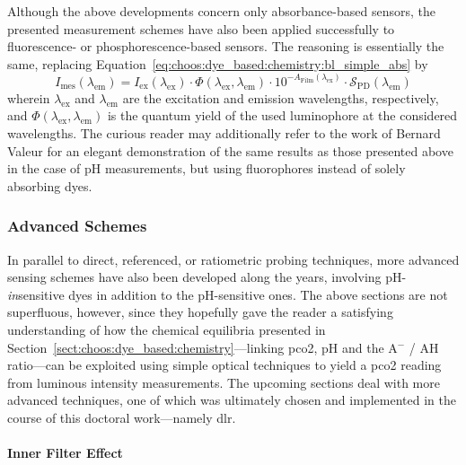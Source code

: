 Although the above developments concern only absorbance-based sensors, the presented measurement schemes have also been applied successfully to fluorescence- or phosphorescence-based sensors\cite{uttamlal1995, ge2003, ge2014, wang2020}. The reasoning is essentially the same, replacing Equation~\ref{eq:choos:dye_based:chemistry:bl_simple_abs} by
\begin{equation}
	I_\text{mes}(\lambda_\text{em}) = I_\text{ex}(\lambda_\text{ex}) \cdot \Phi(\lambda_\text{ex}, \lambda_\text{em}) \cdot 10^{-A_\text{Film}(\lambda_\text{ex})} \cdot \mathcal{S}_\text{PD}(\lambda_\text{em})
\end{equation}
wherein $\lambda_\text{ex}$ and $\lambda_\text{em}$ are the excitation and emission wavelengths, respectively, and $\Phi(\lambda_\text{ex}, \lambda_\text{em})$ is the quantum yield of the used luminophore at the considered wavelengths. The curious reader may additionally refer to the work of Bernard Valeur\cite[p.~338]{valeur2001_chap10} for an elegant demonstration of the same results as those presented above in the case of pH measurements, but using fluorophores instead of solely absorbing dyes.

\subsubsection{Advanced Schemes}\label{sect:choos:dye_based:optical_schemes:advanced}

In parallel to direct, referenced, or ratiometric probing techniques, more advanced sensing schemes have also been developed along the years, involving pH-\emph{in}sensitive dyes in addition to the pH-sensitive ones. The above sections are not superfluous, however, since they hopefully gave the reader a satisfying understanding of how the chemical equilibria presented in Section~\ref{sect:choos:dye_based:chemistry}---linking \gls{pco2}, pH and the A$^-$ / AH ratio---can be exploited using simple optical techniques to yield a \gls{pco2} reading from luminous intensity measurements. The upcoming sections deal with more advanced techniques, one of which was ultimately chosen and implemented in the course of this doctoral work---namely \gls{dlr}.

\paragraph{Inner Filter Effect}\label{subsect:choos:dye_based:optical_schemes:ife}\mbox{}\\

